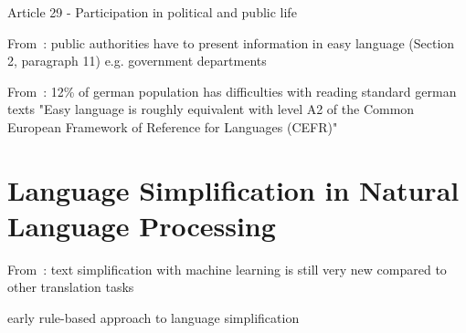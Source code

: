 Article 29 - Participation in political and public life



From~\autocite{bgg2018}:
public authorities have to present information in easy language (Section 2, paragraph 11) e.g\@. government departments




From~\autocite{schomacker2023data}:
12\% of german population has difficulties with reading standard german texts
"Easy language is roughly equivalent with level A2 of the Common European Framework of Reference for Languages (CEFR)"

\section{Language Simplification in Natural Language Processing}\label{sec:langSimp}


From~\autocite{schomacker2023data}:
text simplification with machine learning is still very new compared to other translation tasks



early rule-based approach to language simplification~\autocite{suter2016}







